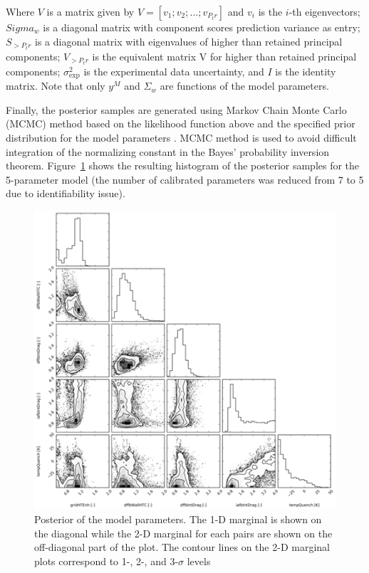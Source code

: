 \documentclass[11pt,titlepage]{article}
\begin{document}
Where $V$ is a matrix given by $V=[v_1;v_2;\dots;v_{P_tr}]$ and $v_i$ is 
the $i$-th eigenvectors; $Sigma_w$ is a diagonal matrix with component 
scores prediction variance as entry;  $S_{>P_tr}$ is a diagonal matrix 
with eigenvalues of higher than retained principal components; 
$V_{>P_tr}$ is the equivalent matrix V for higher than retained 
principal components; $\sigma_\text{exp}^2$ is the experimental data 
uncertainty, and $I$ is the identity matrix. 
Note that only $y^M$ and $\Sigma_w$ are functions of the model parameters.

Finally, the posterior samples are generated using Markov Chain Monte Carlo 
(MCMC) method based on the likelihood function 
above and the specified prior distribution for the model parameters 
\cite{Wicaksono2016}. 
MCMC method is used to avoid difficult integration of the normalizing 
constant in the Bayes’ probability inversion theorem. 
Figure~\ref{fig:mcmc} shows the resulting histogram of the posterior samples for 
the 5-parameter model 
(the number of calibrated parameters was reduced from 7 to 5 due to 
identifiability issue).

\begin{figure}[h!]
	\centering
	\includegraphics[scale=0.95]{figures/mcmc.png}
	\caption{Posterior of the model parameters. The 1-D marginal is shown on 
	    the diagonal while the 2-D marginal for each pairs are shown on the 
	    off-diagonal part of the plot. The contour lines on the 2-D marginal
	    plots correspond to 1-, 2-, and 3-$\sigma$ levels}
	\label{fig:mcmc}
\end{figure}
\end{document}
